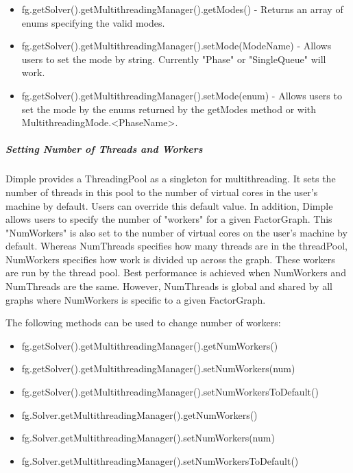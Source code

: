 \fi

\ifjava
\begin{itemize}
\item fg.getSolver().getMultithreadingManager().getModes() - Returns an array of enums specifying the valid modes.
\item fg.getSolver().getMultithreadingManager().setMode(ModeName) - Allows users to set the mode by string.  Currently "Phase" or "SingleQueue" will work.
\item fg.getSolver().getMultithreadingManager().setMode(enum) - Allows users to set the mode by the enums returned by the getModes method or with MultithreadingMode.<PhaseName>.
\end{itemize}
\fi

\subparagraph{Setting Number of Threads and Workers}

Dimple provides a ThreadingPool as a singleton for multithreading.  It sets the number of threads in this pool to the number of virtual cores in the user's machine by default.  Users can override this default value.  In addition, Dimple allows users to specify the number of "workers" for a given FactorGraph.  This "NumWorkers" is also set to the number of virtual cores on the user's machine by default.  Whereas NumThreads specifies how many threads are in the threadPool, NumWorkers specifies how work is divided up across the graph.  These workers are run by the thread pool.  Best performance is achieved when NumWorkers and NumThreads are the same.  However, NumThreads is global and shared by all graphs where NumWorkers is specific to a given FactorGraph.

The following methods can be used to change number of workers:

\ifjava
\begin{itemize}
\item fg.getSolver().getMultithreadingManager().getNumWorkers()
\item fg.getSolver().getMultithreadingManager().setNumWorkers(num)
\item fg.getSolver().getMultithreadingManager().setNumWorkersToDefault()
\end{itemize}
\fi

\ifmatlab
\begin{itemize}
\item fg.Solver.getMultithreadingManager().getNumWorkers()
\item fg.Solver.getMultithreadingManager().setNumWorkers(num)
\item fg.Solver.getMultithreadingManager().setNumWorkersToDefault()
\end{itemize}
\fi

